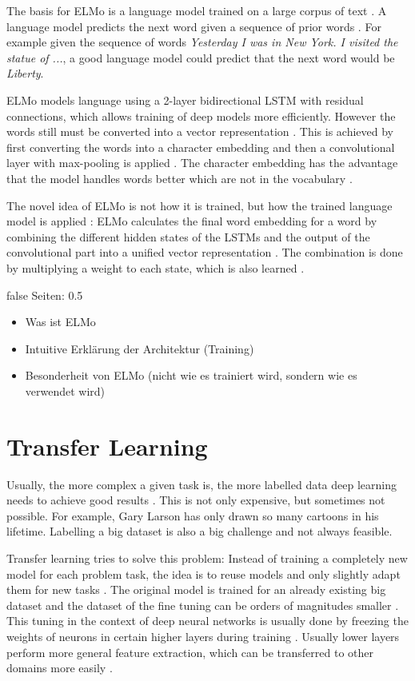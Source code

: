 \documentclass[draft,final,oneside]{vutinfth} %
\begin{document}
The basis for ELMo is a language model trained on a large corpus of text \cite{elmo}. A language model predicts the next word given a sequence of prior words \cite{statisticalnlp}. For example given the sequence of words \textit{Yesterday I was in New York. I visited the statue of ...}, a good language model could predict that the next word would be \textit{Liberty}.

ELMo models language using a 2-layer bidirectional LSTM with residual connections, which allows training of deep models more efficiently. However the words still must be converted into a vector representation \cite{elmo}. This is achieved by first converting the words into a character embedding and then a convolutional layer with max-pooling is applied \cite{elmo}. The character embedding has the advantage that the model handles words better which are not in the vocabulary \cite{elmo}.

The novel idea of ELMo is not how it is trained, but how the trained language model is applied \cite{elmo}: ELMo calculates the final word embedding for a word by combining the different hidden states of the LSTMs and the output of the convolutional part into a unified vector representation \cite{elmo}. The combination is done by multiplying a weight to each state, which is also learned \cite{elmo}.

\if false
Seiten: 0.5

\begin{itemize}
\item Was ist ELMo
\item Intuitive Erklärung der Architektur (Training)
\item Besonderheit von ELMo (nicht wie es trainiert wird, sondern wie es verwendet wird)
\end{itemize}

\fi
\pagebreak
\section{Transfer Learning} \label{transferlearning}

Usually, the more complex a given task is, the more labelled data deep learning needs to achieve good results \cite{Goodfellow-et-al-2016}. This is not only expensive, but sometimes not possible. For example, Gary Larson has only drawn so many cartoons in his lifetime. Labelling a big dataset is also a big challenge and not always feasible.

Transfer learning tries to solve this problem: Instead of training a completely new model for each problem task, the idea is to reuse models and only slightly adapt them for new tasks \cite{Goodfellow-et-al-2016}. The original model is trained for an already existing big dataset and the dataset of the fine tuning can be orders of magnitudes smaller \cite{dlvc}. This tuning in the context of deep neural networks is usually done by freezing the weights of neurons in certain higher layers during training \cite{Goodfellow-et-al-2016}. Usually lower layers perform more general feature extraction, which can be transferred to other domains more easily \cite{dlvc}.
\end{document}
